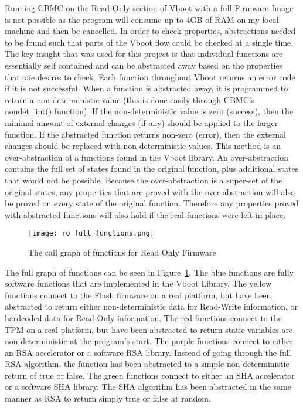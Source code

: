 \documentclass[../report.tex]{subfiles}
\begin{document}
Running CBMC on the Read-Only section of Vboot with a full Firmware Image is not possible as the program will consume up to 4GB of RAM on my local machine and then be cancelled.
In order to check properties, abstractions needed to be found such that parts of the Vboot flow could be checked at a single time.
The key insight that was used for this project is that individual functions are essentially self contained and can be abstracted away based on the properties that one desires to check.
Each function throughout Vboot returns an error code if it is not successful.
When a function is abstracted away, it is programmed to return a non-deterministic value (this is done easily through CBMC's nondet\_int() function).
If the non-deterministic value is zero (success), then the minimal amount of external changes (if any) should be applied to the larger function.
If the abstracted function returns non-zero (error), then the external changes should be replaced with non-deterministic values.
This method is an over-abstraction of a functions found in the Vboot library.
An over-abstraction contains the full set of states found in the original function, plus additional states that would not be possible.
Because the over-abstraction is a super-set of the original states, any properties that are proved with the over-abstraction will also be proved on every state of the original function.
Therefore any properties proved with abstracted functions will also hold if the real functions were left in place.

\begin{figure}
  \centering
  \texttt{[image: ro\_full\_functions.png]}
  \caption{The call graph of functions for Read Only Firmware}\label{fig:full_functions}
\end{figure}

The full graph of functions can be seen in Figure~\ref{fig:full_functions}.
The blue functions are fully software functions that are implemented in the Vboot Library.
The yellow functions connect to the Flash firmware on a real platform, but have been abstracted to return either non-deterministic data for Read-Write information, or hardcoded data for Read-Only information.
The red functions connect to the TPM on a real platform, but have been abstracted to return static variables are non-deterministic at the program's start.
The purple functions connect to either an RSA accelerator or a software RSA library. Instead of going through the full RSA algorithm, the function has been abstracted to a simple non-deterministic return of true or false. 
The green functions connect to either an SHA accelerator or a software SHA library.
The SHA algorithm has been abstracted in the same manner as RSA to return simply true or false at random.
\end{document}
